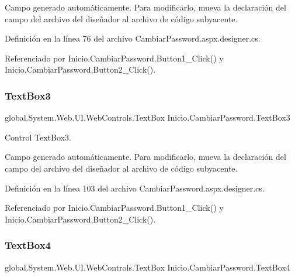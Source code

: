 Campo generado automáticamente. Para modificarlo, mueva la declaración del campo del archivo del diseñador al archivo de código subyacente. 

Definición en la línea 76 del archivo Cambiar\+Password.\+aspx.\+designer.\+cs.



Referenciado por Inicio.\+Cambiar\+Password.\+Button1\+\_\+\+Click() y Inicio.\+Cambiar\+Password.\+Button2\+\_\+\+Click().

\mbox{\label{classInicio_1_1CambiarPassword_affa43c3fb9f3daacfb67965c2c50466f}} 
\subsubsection{\texorpdfstring{TextBox3}{TextBox3}}
{\footnotesize\ttfamily global.\+System.\+Web.\+U\+I.\+Web\+Controls.\+Text\+Box Inicio.\+Cambiar\+Password.\+Text\+Box3\hspace{0.3cm}{\ttfamily [protected]}}



Control Text\+Box3. 

Campo generado automáticamente. Para modificarlo, mueva la declaración del campo del archivo del diseñador al archivo de código subyacente. 

Definición en la línea 103 del archivo Cambiar\+Password.\+aspx.\+designer.\+cs.



Referenciado por Inicio.\+Cambiar\+Password.\+Button1\+\_\+\+Click() y Inicio.\+Cambiar\+Password.\+Button2\+\_\+\+Click().

\mbox{\label{classInicio_1_1CambiarPassword_a9365f80de4f65ec031a704d80d0b5c51}} 
\subsubsection{\texorpdfstring{TextBox4}{TextBox4}}
{\footnotesize\ttfamily global.\+System.\+Web.\+U\+I.\+Web\+Controls.\+Text\+Box Inicio.\+Cambiar\+Password.\+Text\+Box4\hspace{0.3cm}{\ttfamily [protected]}}



